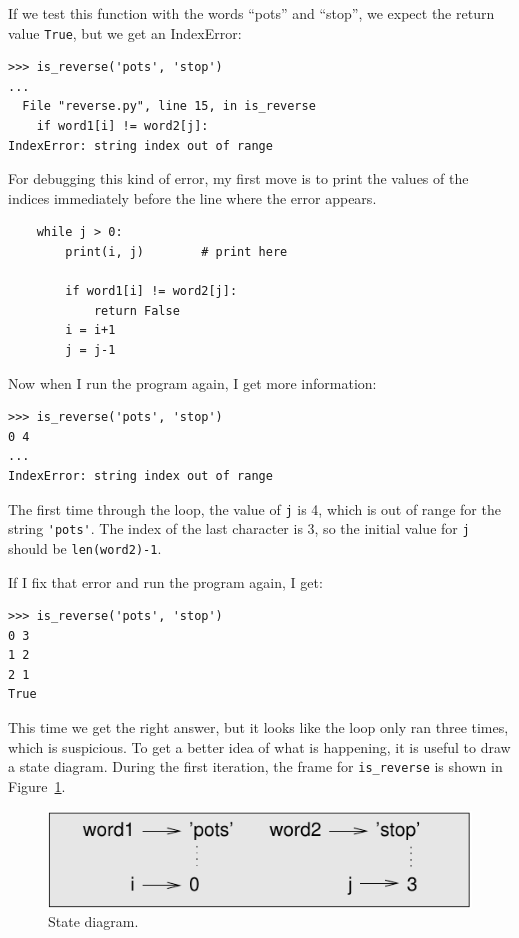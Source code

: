 \documentclass[10pt]{book}
\begin{document}
If we test this function with the words ``pots'' and ``stop'', we
expect the return value {\tt True}, but we get an IndexError:

\begin{verbatim}
>>> is_reverse('pots', 'stop')
...
  File "reverse.py", line 15, in is_reverse
    if word1[i] != word2[j]:
IndexError: string index out of range
\end{verbatim}
%
For debugging this kind of error, my first move is to
print the values of the indices immediately before the line
where the error appears.

\begin{verbatim}
    while j > 0:
        print(i, j)        # print here
        
        if word1[i] != word2[j]:
            return False
        i = i+1
        j = j-1
\end{verbatim}
%
Now when I run the program again, I get more information:

\begin{verbatim}
>>> is_reverse('pots', 'stop')
0 4
...
IndexError: string index out of range
\end{verbatim}
%
The first time through the loop, the value of {\tt j} is 4,
which is out of range for the string \verb"'pots'".
The index of the last character is 3, so the
initial value for {\tt j} should be {\tt len(word2)-1}.

If I fix that error and run the program again, I get:

\begin{verbatim}
>>> is_reverse('pots', 'stop')
0 3
1 2
2 1
True
\end{verbatim}
%
This time we get the right answer, but it looks like the loop only ran
three times, which is suspicious.  To get a better idea of what is
happening, it is useful to draw a state diagram.  During the first
iteration, the frame for \verb"is_reverse" is shown in
Figure~\ref{fig.state4}.   

\begin{figure}
\centerline
{\includegraphics[scale=0.8]{figs/state4.pdf}}
\caption{State diagram.}
\label{fig.state4}
\end{figure}
\end{document}
